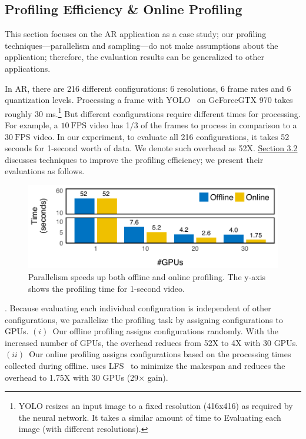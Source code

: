 \subsection{Profiling Efficiency \& Online Profiling}
\label{sec:online-profiling}

This section focuses on the AR application as a case study; our profiling
techniques---parallelism and sampling---do not make assumptions about the
application; therefore, the evaluation results can be generalized to other
applications.

In AR, there are 216 different configurations: 6 resolutions, 6 frame rates and
6 quantization levels. Processing a frame with YOLO~\cite{redmon2016yolo9000} on
GeForce\textregistered\space GTX 970 takes roughly 30 ms.\footnote{YOLO resizes
  an input image to a fixed resolution (416x416) as required by the neural
  network. It takes a similar amount of time to Evaluating each image (with
  different resolutions).} But different configurations require different times
for processing. For example, a \(10~\text{FPS}\) video has 1/3 of the frames to
process in comparison to a \(30~\text{FPS}\) video.  In our experiment, to
evaluate all 216 configurations, it takes 52 seconds for 1-second worth of
data. We denote such overhead as
52X\@. \hyperref[sec:automatic-profiling]{Section 3.2} discusses techniques to
improve the profiling efficiency; we present their evaluations as follows.

\begin{figure}
  \centering
  \includegraphics[width=1.0\columnwidth]{figures/parallel.pdf}
  \caption{Parallelism speeds up both offline and online profiling.
  The y-axis shows the profiling time for 1-second video.}
  \label{fig:parallel}
\end{figure}

. Because
evaluating each individual configuration is independent of other configurations,
we parallelize the profiling task by assigning configurations to GPUs.
$(i)$~Our offline profiling assigns configurations randomly.  With the increased
number of GPUs, the overhead reduces from 52X to 4X with 30 GPUs.  $(ii)$~Our
online profiling assigns configurations based on the processing times collected
during offline.  \sysname{} uses LFS~\cite{karger2010scheduling} to minimize the
makespan and reduces the overhead to 1.75X with 30 GPUs (29$\times$ gain).

